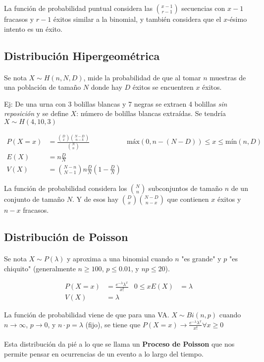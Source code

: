 \documentclass[../main.tex]{subfiles}
\begin{document}
La función de probabilidad puntual considera las \(\binom{x-1}{r-1}\) secuencias con \(x-1\) fracasos y \(r-1\) éxitos similar a la binomial, y también considera que el \(x\)-ésimo intento es un éxito.

\subsection{Distribución Hipergeométrica}

\paragraph{} Se nota \(X \sim H(n, N, D)\), mide la probabilidad de que al tomar \(n\) muestras de una población de tamaño \(N\) donde hay \(D\) éxitos se encuentren \(x\) éxitos.

Ej: De una urna con 3 bolillas blancas y 7 negras se extraen 4 bolillas \textit{sin reposición} y se define \(X\): número de bolillas blancas extraídas. Se tendría \(X \sim H(4, 10, 3)\)

\begin{align*}
  P(X = x) &= \frac{\binom{D}{x}\binom{N-D}{n-k}}{\binom{N}{n}} & \text{máx}(0, n - (N-D)) \leq x \leq \text{mín}(n, D) \\
  E(X) &= n\frac{D}{N} \\
  V(X) &= \binom{N-n}{N-1}n\frac{D}{N}(1-\frac{D}{N})
\end{align*}

La función de probabilidad considera los \(\binom{N}{n}\) subconjuntos de tamaño \(n\) de un conjunto de tamaño \(N\). Y de esos hay \(\binom{D}{x}\binom{N-D}{n-x}\) que contienen \(x\) éxitos y \(n-x\) fracasos.

\subsection{Distribución de Poisson}

\paragraph{} Se nota \(X \sim P(\lambda)\) y aproxima a una binomial cuando \(n\) "es grande" y \(p\) "es chiquito" (generalmente \(n \geq 100\), \(p \leq 0.01\), y \(np \leq 20\)).

\begin{align*}
  P(X = x) &= \frac{e^{-\lambda}\lambda^{x}}{x!} & 0 \leq x
  E(X) &= \lambda \\
  V(X) &= \lambda
\end{align*}

La función de probabilidad viene de que para una VA. \(X \sim Bi(n, p)\) cuando \(n \rightarrow \infty\), \(p \rightarrow 0\), y \(n \cdot p = \lambda\) (fijo), se tiene que \(P(X = x) \rightarrow \frac{e^{-\lambda}\lambda^{x}}{x!} \forall x \geq 0\)

\paragraph{} Esta distribución da pié a lo que se llama un \textbf{Proceso de Poisson} que nos permite pensar en ocurrencias de un evento a lo largo del tiempo. %
\end{document}
